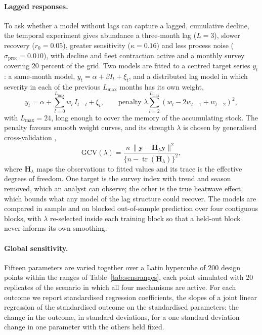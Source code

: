 \documentclass[11pt,a4paper]{article}
\newcommand{\vt}[1]{\text{#1}}
\begin{document}
\paragraph{Lagged responses.} To ask whether a model without lags can capture a lagged, cumulative decline, the temporal experiment gives abundance a three-month lag ($L=3$), slower recovery ($r_0=0.05$), greater sensitivity ($\kappa=0.16$) and less process noise ($\sigma_{\vt{proc}}=0.010$), with decline and fleet contraction active and a monthly survey covering 20 percent of the grid. Two models are fitted to a centred target series $y_t$: a same-month model, $y_t = \alpha + \beta I_t + \xi_t$, and a distributed lag model in which severity in each of the previous $L_{\max}$ months has its own weight,
\begin{equation}
y_t = \alpha + \sum_{l=0}^{L_{\max}} w_l\,I_{t-l} + \xi_t, \qquad \vt{penalty } \lambda\sum_{l=2}^{L_{\max}}\left(w_l - 2w_{l-1} + w_{l-2}\right)^2,
\label{eq:dlag}
\end{equation}
with $L_{\max}=24$, long enough to cover the memory of the accumulating stock. The penalty favours smooth weight curves, and its strength $\lambda$ is chosen by generalised cross-validation \citep{craven1979},
\begin{equation}
\mathrm{GCV}(\lambda) = \frac{n\,\lVert \mathbf{y} - \mathbf{H}_\lambda \mathbf{y}\rVert^2}{\{n - \operatorname{tr}(\mathbf{H}_\lambda)\}^2},
\label{eq:gcv}
\end{equation}
where $\mathbf{H}_\lambda$ maps the observations to fitted values and its trace is the effective degrees of freedom. One target is the survey index with trend and season removed, which an analyst can observe; the other is the true heatwave effect, which bounds what any model of the lag structure could recover. The models are compared in sample and on blocked out-of-sample prediction over four contiguous blocks, with $\lambda$ re-selected inside each training block so that a held-out block never informs its own smoothing.

\paragraph{Global sensitivity.} Fifteen parameters are varied together over a Latin hypercube of 200 design points within the ranges of Table~\ref{tab:sensranges}, each point simulated with 20 replicates of the scenario in which all four mechanisms are active. For each outcome we report standardised regression coefficients, the slopes of a joint linear regression of the standardised outcome on the standardised parameters: the change in the outcome, in standard deviations, for a one standard deviation change in one parameter with the others held fixed.
\end{document}

